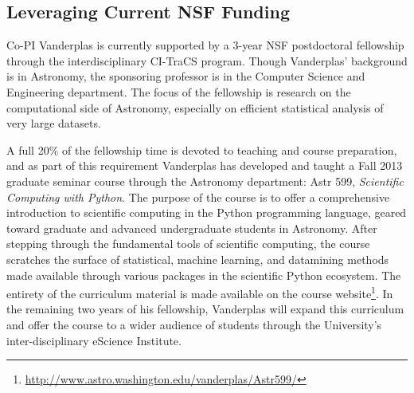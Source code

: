 \subsection{Leveraging Current NSF Funding}

Co-PI Vanderplas is currently supported by a 3-year NSF postdoctoral
fellowship through the interdisciplinary CI-TraCS program.  Though
Vanderplas' background is in Astronomy, the sponsoring professor is in
the Computer Science and Engineering department.  The focus of the
fellowship is research on the computational side of Astronomy, especially
on efficient statistical analysis of very large datasets.

A full 20\% of the fellowship time is devoted to teaching and course
preparation, and as part of this requirement Vanderplas has developed
and taught a Fall 2013
graduate seminar course through the Astronomy department:
Astr 599, {\it Scientific Computing with Python}.  The purpose of the
course is to offer a comprehensive introduction to scientific computing
in the Python programming language, geared toward graduate 
and advanced undergraduate students in Astronomy.
After stepping through the fundamental tools of scientific computing,
the course scratches the surface of statistical, machine learning, and
datamining methods made available through various packages in the scientific
Python ecosystem. The entirety of
the curriculum material is made available on the course website\footnote{
\url{http://www.astro.washington.edu/vanderplas/Astr599/}}.
In the remaining two years of his fellowship, Vanderplas will expand this
curriculum and offer the course to a wider audience of students through
the University's inter-disciplinary eScience Institute.

